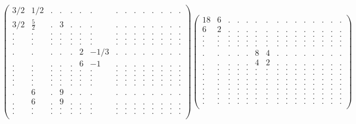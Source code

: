 \documentclass[12pt,a4paper]{amsart}
\begin{document}
\begin{align*}
\left(\begin{array}{rrrrrrrrrrrrrrr}%
3/2&1/2&.&.&.&.&.&.&.&.&.&.&.&.&.\\%
3/2&\frac{5}{2}&.&3&.&.&.&.&.&.&.&.&.&.&.\\%
.&.&.&.&.&.&.&.&.&.&.&.&.&.&.\\%
.&.&.&.&.&.&.&.&.&.&.&.&.&.&.\\%
.&.&.&.&.&.&.&.&.&.&.&.&.&.&.\\%
.&.&.&.&.&2&-1/3&.&.&.&.&.&.&.&.\\%
.&.&.&.&.&6&-1&.&.&.&.&.&.&.&.\\%
.&.&.&.&.&.&.&.&.&.&.&.&.&.&.\\%
.&.&.&.&.&.&.&.&.&.&.&.&.&.&.\\%
.&.&.&.&.&.&.&.&.&.&.&.&.&.&.\\%
.&.&.&.&.&.&.&.&.&.&.&.&.&.&.\\%
.&6&.&9&.&.&.&.&.&.&.&.&.&.&.\\%
.&6&.&9&.&.&.&.&.&.&.&.&.&.&.\\%
.&.&.&.&.&.&.&.&.&.&.&.&.&.&.\\%
.&.&.&.&.&.&.&.&.&.&.&.&.&.&.\\%
\end{array}\right)%
\left(\begin{array}{rrrrrrrrrrrrrrr}%
18&6&.&.&.&.&.&.&.&.&.&.&.&.&.\\%
6&2&.&.&.&.&.&.&.&.&.&.&.&.&.\\%
.&.&.&.&.&.&.&.&.&.&.&.&.&.&.\\%
.&.&.&.&.&.&.&.&.&.&.&.&.&.&.\\%
.&.&.&.&.&.&.&.&.&.&.&.&.&.&.\\%
.&.&.&.&.&8&4&.&.&.&.&.&.&.&.\\%
.&.&.&.&.&4&2&.&.&.&.&.&.&.&.\\%
.&.&.&.&.&.&.&.&.&.&.&.&.&.&.\\%
.&.&.&.&.&.&.&.&.&.&.&.&.&.&.\\%
.&.&.&.&.&.&.&.&.&.&.&.&.&.&.\\%
.&.&.&.&.&.&.&.&.&.&.&.&.&.&.\\%
.&.&.&.&.&.&.&.&.&.&.&.&.&.&.\\%
.&.&.&.&.&.&.&.&.&.&.&.&.&.&.\\%
.&.&.&.&.&.&.&.&.&.&.&.&.&.&.\\%
.&.&.&.&.&.&.&.&.&.&.&.&.&.&.\\%
\end{array}\right)%
\end{align*}
\end{document}
